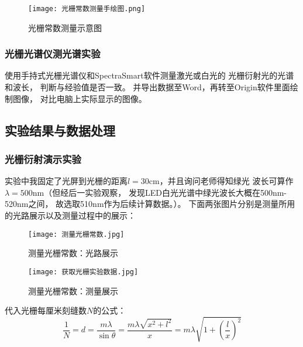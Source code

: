 \documentclass[11pt]{article}
\begin{document}
\begin{figure}[H]
    \centering
    \texttt{[image: 光栅常数测量手绘图.png]}
    \caption{光栅常数测量示意图}
\end{figure}

\subsubsection*{光栅光谱仪测光谱实验}

使用手持式光栅光谱仪和SpectraSmart软件测量激光或白光的
光栅衍射光的光谱和波长，
判断与经验值是否一致。
并导出数据至Word，再转至Origin软件里面绘制图像，
对比电脑上实际显示的图像。


\subsection{实验结果与数据处理}

\subsubsection*{光栅衍射演示实验}

实验中我固定了光屏到光栅的距离$l=30$cm，并且询问老师得知绿光
波长可算作$\lambda=500$nm（但经后一实验观察，
发现LED白光光谱中绿光波长大概在500nm-520nm之间，
故选取510nm作为后续计算数据。）。
下面两张图片分别是测量所用的光路展示以及测量过程中的展示：


\begin{figure}[H]
    \centering
    \texttt{[image: 测量光栅常数.jpg]}
    \caption{测量光栅常数：光路展示}
\end{figure}

\begin{figure}[H]
    \centering
    \texttt{[image: 获取光栅实验数据.jpg]}
    \caption{测量光栅常数：测量展示}
\end{figure}


代入光栅每厘米刻缝数$N$的公式：
\[
    \frac 1N=d=\frac{m\lambda}{\sin{\theta}}=\frac{m\lambda\sqrt{x^2+l^2}}{x}=m\lambda\sqrt{1+\left(\frac{l}{x}\right)^2}
\]
\end{document}
